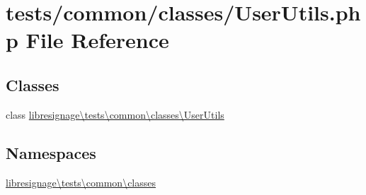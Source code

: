 \hypertarget{UserUtils_8php}{}\section{tests/common/classes/\+User\+Utils.php File Reference}
\label{UserUtils_8php}
\subsection*{Classes}
\begin{DoxyCompactItemize}
\item 
class \hyperlink{classlibresignage_1_1tests_1_1common_1_1classes_1_1UserUtils}{libresignage\textbackslash{}tests\textbackslash{}common\textbackslash{}classes\textbackslash{}\+User\+Utils}
\end{DoxyCompactItemize}
\subsection*{Namespaces}
\begin{DoxyCompactItemize}
\item 
 \hyperlink{namespacelibresignage_1_1tests_1_1common_1_1classes}{libresignage\textbackslash{}tests\textbackslash{}common\textbackslash{}classes}
\end{DoxyCompactItemize}
